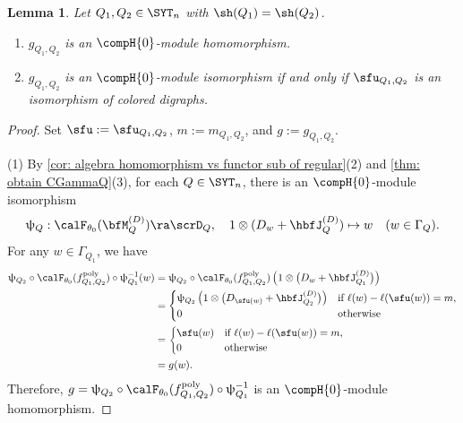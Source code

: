 \documentclass[12pt, reqno]{amsart}
\theoremstyle{plain}
\newtheorem{lemma}[lemma]{Lemma}
\theoremstyle{definition}
\numberwithin{equation}{section}
\numberwithin{figure}{section}
\numberwithin{table}{section}
\begin{document}
\begin{lemma}\label{lem: new lem for g Q Q}
Let $Q_1, Q_2 \in \SYT_n$ with $\sh(Q_1) = \sh(Q_2)$.
\begin{enumerate}[label = {\rm (\arabic*)}]
\item $g_{Q_1, Q_2}$ is an $\compH{0}$-module homomorphism. 
\item $g_{Q_1, Q_2}$ is an $\compH{0}$-module isomorphism if and only if  $\sfu_{Q_1,Q_2}$ is an isomorphism of colored digraphs.
\end{enumerate}
\end{lemma}
\begin{proof}
Set
$\sfu:=\sfu_{Q_1,Q_2}$, $m:=m_{Q_1,Q_2}$, and $g := g_{Q_1, Q_2}$.

(1) 
By \cref{cor: algebra homomorphism vs functor sub of regular}(2) and
\cref{thm: obtain CGammaQ}(3), for each
$Q \in \SYT_n$, there is an $\compH{0}$-module isomorphism
\[
\uppsi_{Q}: \calF_{\theta_0}(\bfM^{(D)}_Q) \ra \scrD_{Q}, \quad 1 \otimes(D_w+\hbfJ^{(D)}_Q) \mapsto w\quad (w \in \Gamma_Q).
\]
For any $w \in \Gamma_{Q_1}$, we have
\begin{align*}
\uppsi_{Q_2}\circ \calF_{\theta_0}(f^{\rm poly}_{Q_1, Q_2}) \circ \uppsi_{Q_1}^{-1}(w) 
& = \uppsi_{Q_2}\circ \calF_{\theta_0}(f^{\rm poly}_{Q_1, Q_2})
\left(
1 \otimes \bigl(D_w + \hbfJ^{(D)}_{Q_1} \bigr) \right) \\
& = 
\begin{cases}
\uppsi_{Q_2}\left(
1 \otimes \bigl(D_{\sfu(w)} + \hbfJ^{(D)}_{Q_2}\bigr)
\right)
& \text{if $\ell(w) - \ell(\sfu(w)) = m$} ,
\\
0 & \text{otherwise}
\end{cases} \\
& =
\begin{cases}
\sfu(w)
& \text{if $\ell(w) - \ell(\sfu(w)) = m$} ,
\\
0 & \text{otherwise}
\end{cases} \\
& = g(w).
\end{align*}
Therefore, $g = \uppsi_{Q_2}
\circ \calF_{\theta_0}(f^{\rm poly}_{Q_1,Q_2})
\circ \uppsi_{Q_1}^{-1}$ is an $\compH{0}$-module homomorphism.



\end{proof}
\end{document}
